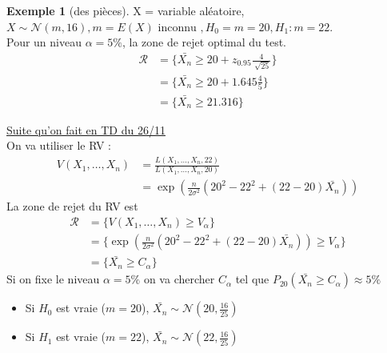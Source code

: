 \documentclass{article}
\theoremstyle{plain}%
\theoremstyle{definition}
\newtheorem{exmp}{Exemple}[section]
\theoremstyle{remark}
\begin{document}
\begin{exmp}[des pièces]
    X = variable aléatoire, $ X \sim \mathcal{N}(m, 16), m = E(X) \text{ inconnu }, H_0 = m = 20, H_1 : m = 22 $. \\
    Pour un niveau $ \alpha =5\% $, la zone de rejet optimal du test. 
    \begin{align*}
        \mathcal{R} &= \{\bar{X_n} \geq 20 + z_{0.95} \frac{4}{\sqrt[]{25}}\} \\
        &= \{\bar{X_n} \geq 20 + 1.645 \frac{4}{5}\} \\
        &= \{\bar{X_n} \geq 21.316\}
    \end{align*}

    \underline{Suite qu'on fait en TD du 26/11} \\

    On va utiliser le RV : 
    \begin{align*}
        V(X_1, \dots, X_n) &= \frac{L(X_1, \dots, X_n, 22)}{L(X_1, \dots, X_n, 20)} \\
            &= \exp (\frac{n}{2 \sigma ^2} (20^2 - 22^2 + (22-20) \bar{X_n}))
    \end{align*}
    La zone de rejet du RV est 
    \begin{align*}
        \mathcal{R} &= \{V(X_1, \dots, X_n) \geq V_\alpha \} \\
            &= \{\exp (\frac{n}{2 \sigma ^2} (20^2 - 22^2 + (22-20) \bar{X_n})) \geq V_\alpha  \} \\
            &= \{\bar{X_n} \geq C_\alpha \}
    \end{align*}
    Si on fixe le niveau $ \alpha = 5\% $ on va chercher $ C_\alpha $ tel que $ P_{20} (\bar{X_n} \geq C_\alpha ) \approx 5\% $

    \begin{itemize}
        \item Si $ H_0 $ est vraie ($ m=20 $), $ \bar{X_n} \sim \mathcal{N}(20, \frac{16}{25}) $
        \item Si $ H_1 $ est vraie ($ m=22 $), $ \bar{X_n} \sim \mathcal{N}(22, \frac{16}{25}) $
    \end{itemize}


\end{exmp}
\end{document}
